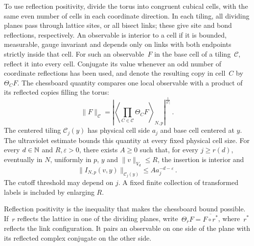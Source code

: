 To use reflection positivity, divide the torus into congruent cubical cells, with the same even number of cells in each coordinate direction.
In each tiling, all dividing planes pass through lattice sites, or all bisect links; these give site and bond reflections, respectively.
An observable is interior to a cell if it is bounded, measurable, gauge invariant and depends only on links with both endpoints strictly inside that cell.
For such an observable~$F$ in the base cell of a tiling~$\mathcal C$, reflect it into every cell.
Conjugate its value whenever an odd number of coordinate reflections has been used, and denote the resulting copy in cell~$C$ by~$\Theta_C F$.
The chessboard quantity compares one local observable with a product of its reflected copies filling the torus:
\begin{equation}\label{eq:iv-root}
\|F\|_{\mathcal C}
 =\left|\left\langle\prod_{C\in\mathcal C}\Theta_C F\right\rangle_{N,p}\right|^{\frac{1}{|\mathcal C|}}\,.
\end{equation}
The centered tiling $\mathcal C_j(y)$ has physical cell side $a_j$ and base cell centered at $y$.
The ultraviolet estimate bounds this quantity at every fixed physical cell size.
For every $d\in\mathbb N$ and $R,\varepsilon>0$, there exists $A\ge0$ such that, for every $j\ge r(d)$, eventually in $N$, uniformly in $p$, $y$ and $\|v\|_{V_d}\le R$, the insertion is interior and
\begin{equation}\label{eq:iv-centered}
\|I_{N,p}(v,y)\|_{\mathcal C_j(y)}\le A a_j^{-d-\varepsilon}\,.
\end{equation}
The cutoff threshold may depend on $j$.
A fixed finite collection of transformed labels is included by enlarging $R$.


Reflection positivity is the inequality that makes the chessboard bound possible.
If~$r$ reflects the lattice in one of the dividing planes, write~$\Theta_r F=\overline{F\circ r^*}$, where~$r^*$ reflects the link configuration.
It pairs an observable on one side of the plane with its reflected complex conjugate on the other side.


